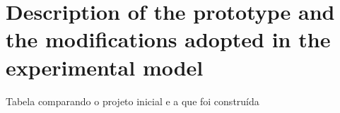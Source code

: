 \section{Description of the prototype and the modifications adopted in the experimental model}
Tabela comparando o projeto inicial e a que foi construída